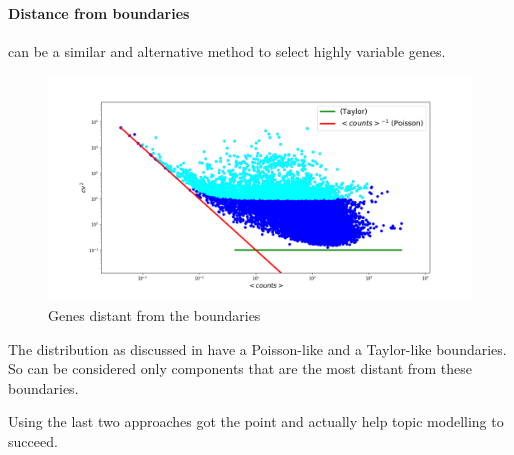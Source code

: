 \paragraph{Distance from boundaries} can be a similar and alternative method to select highly variable genes.
\begin{figure}[htb!]
    \centering
    \includegraphics[width=0.8\linewidth]{pictures/topic/cvmean_oversampling.png}
    \caption{Genes distant from the boundaries}
    \label{fig:topic/cvmean_oversampling}
\end{figure}
The distribution as discussed in  have a Poisson-like and a Taylor-like boundaries. So can be considered only components that are the most distant from these boundaries.

Using the last two approaches got the point and actually help topic modelling to succeed.